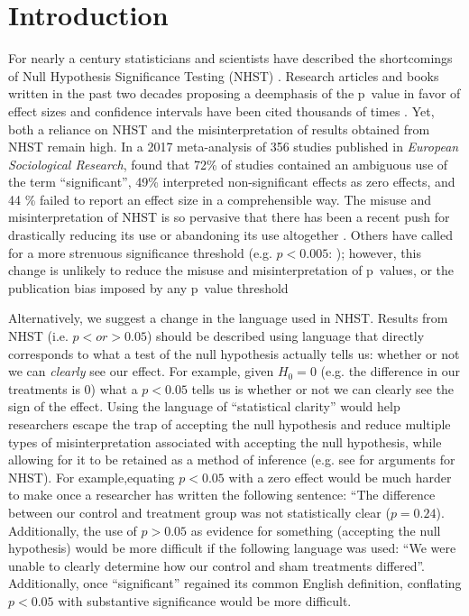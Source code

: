 \flushbottom
\maketitle
\newpage
\thispagestyle{empty}

\section*{Introduction}

For nearly a century statisticians and scientists have described the shortcomings of Null Hypothesis Significance Testing
(NHST) \citep[see][]{Cohen1994}. Research articles and books written in the past two decades proposing a deemphasis of the 
p~value in favor of effect sizes and confidence intervals have been cited thousands of times \citep{Cohen1994, Goodman1999, 
Wilkinson1999, ZiliakandMcCloskey2008, WassersteinandLazar2016}. Yet, both a reliance on NHST and the misinterpretation of 
results obtained from NHST remain high. In a 2017 meta-analysis of 356 studies published in \emph{European Sociological 
Research}, \citet{Bernardietal.2017} found that 72\% of studies contained an ambiguous use of the term ``significant'', 
49\% interpreted non-significant effects as zero effects, and 44 \% failed to report an effect size in a comprehensible 
way. The misuse and misinterpretation of NHST is so pervasive that there has been a recent push for drastically reducing its 
use \citep{SzucsandIoannidis2017} or abandoning its use altogether \citep{McShaneetal.2017}. Others have called for a more
strenuous significance threshold (e.g. $p < 0.005$: \citealt{Benjaminetal.2018}); however, this change is unlikely to reduce
the misuse and misinterpretation of p~values, or the publication bias imposed by any p~value threshold 
\citep{Ridleyetal.2007}

Alternatively, we suggest a change in the language used in NHST. Results from NHST (i.e. $p < or > 0.05$) should be 
described using language that directly corresponds to what a test of the null hypothesis actually tells us: whether or not 
we can \emph{clearly} see our effect. For example, given $H_{0} = 0$ (e.g. the difference in our treatments is 0) what a 
$p < 0.05$ tells us is whether or not we can clearly see the sign of the effect. Using the language of ``statistical 
clarity'' would help researchers escape the trap of accepting the null hypothesis and reduce multiple types of
misinterpretation associated with accepting the null hypothesis, while allowing for it to be retained as a method of 
inference (e.g. see \citealt{Abelson1997} for arguments for NHST). For example,equating $p < 0.05$ with a zero effect would 
be much harder to make once a researcher has written the following sentence: ``The difference between our control and 
treatment group was not statistically clear ($p = 0.24$). Additionally, the use of $p > 0.05$ as evidence for something 
(accepting the null hypothesis) would be more difficult if the following language was used: ``We were unable to clearly 
determine how our control and sham treatments differed''. Additionally, once ``significant'' regained its common English 
definition, conflating $p < 0.05$ with substantive significance would be more difficult.

